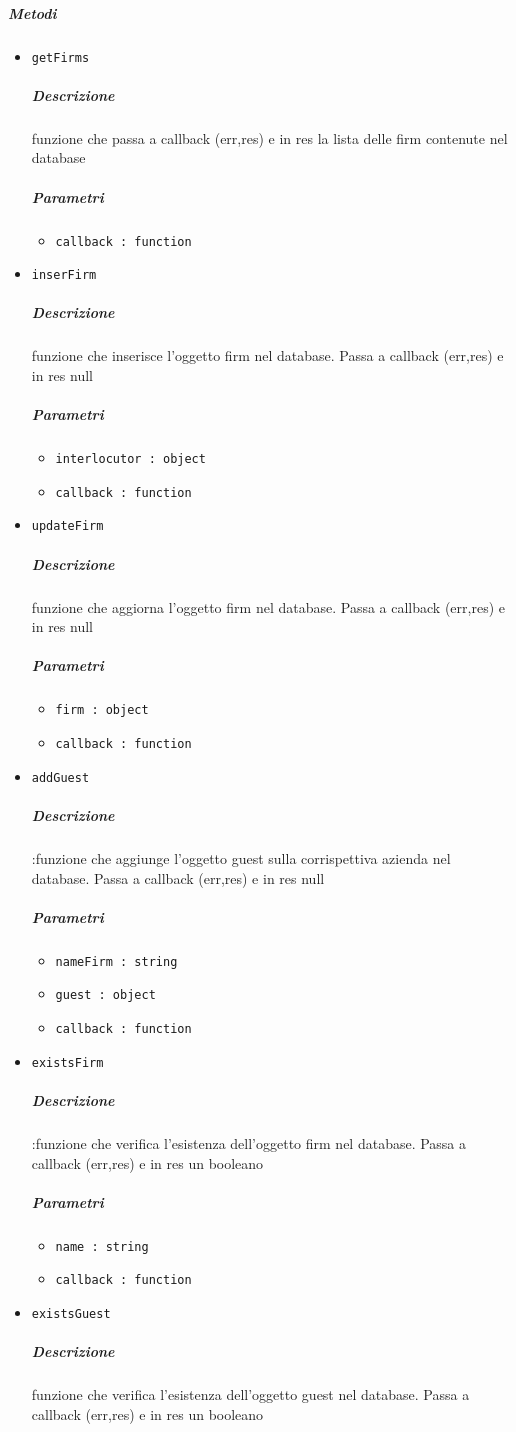 \documentclass[../ManualeSviluppatore_v2.0.0.tex]{subfiles}
\begin{document}
\subparagraph{Metodi}\begin{itemize}
\item \texttt{getFirms}
\subparagraph{Descrizione} funzione che passa a callback (err,res) e in res la lista delle firm contenute nel database
\subparagraph{Parametri} \begin{itemize}
\item \texttt{callback : function}
\end{itemize}
\item \texttt{inserFirm}
\subparagraph{Descrizione} funzione che inserisce l'oggetto firm nel database. Passa a callback (err,res) e in res null
\subparagraph{Parametri} \begin{itemize}
\item \texttt{interlocutor : object}
\item \texttt{callback : function}
\end{itemize}
\item \texttt{updateFirm}
\subparagraph{Descrizione} funzione che aggiorna l'oggetto firm nel database. Passa a callback (err,res) e in res null
\subparagraph{Parametri} \begin{itemize}
\item \texttt{firm : object}
\item \texttt{callback : function}
\end{itemize}
\item \texttt{addGuest}
\subparagraph{Descrizione} :funzione che aggiunge l'oggetto guest sulla corrispettiva azienda nel database. Passa a callback (err,res) e in res null
\subparagraph{Parametri} \begin{itemize}
\item \texttt{nameFirm : string}
\item \texttt{guest : object}
\item \texttt{callback : function}
\end{itemize}
\item \texttt{existsFirm}
\subparagraph{Descrizione} :funzione che verifica l'esistenza dell'oggetto firm nel database. Passa a callback (err,res) e in res un booleano
\subparagraph{Parametri} \begin{itemize}
\item \texttt{name : string}
\item \texttt{callback : function}
\end{itemize}
\item \texttt{existsGuest}
\subparagraph{Descrizione} funzione che verifica l'esistenza dell'oggetto guest nel database. Passa a callback (err,res) e in res un booleano

\end{itemize}
\end{document}
